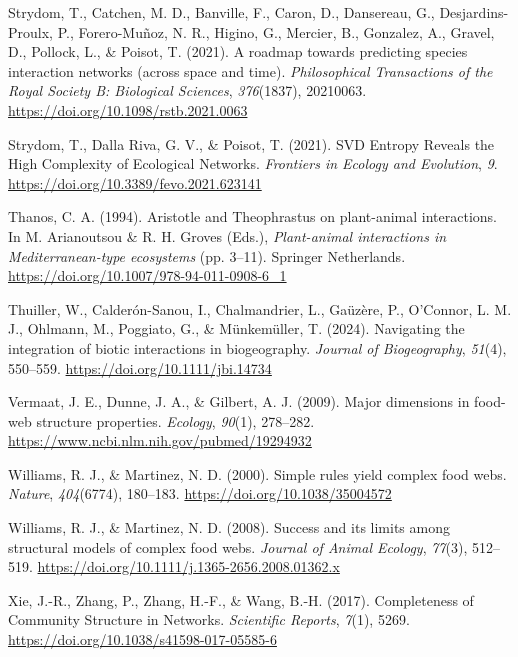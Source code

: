 \documentclass[
]{article}
\newlength{\cslhangindent}
\newenvironment{CSLReferences}[2] %
 {\begin{list}{}{%
  \setlength{\itemindent}{0pt}
  \setlength{\leftmargin}{0pt}
  \setlength{\parsep}{0pt}
  \ifodd #1
   \setlength{\leftmargin}{\cslhangindent}
   \setlength{\itemindent}{-1\cslhangindent}
  \fi
  \setlength{\itemsep}{#2\baselineskip}}}
 {\end{list}}
\begin{document}
\begin{CSLReferences}{1}{0}
Strydom, T., Catchen, M. D., Banville, F., Caron, D., Dansereau, G.,
Desjardins-Proulx, P., Forero-Muñoz, N. R., Higino, G., Mercier, B.,
Gonzalez, A., Gravel, D., Pollock, L., \& Poisot, T. (2021). A roadmap
towards predicting species interaction networks (across space and time).
\emph{Philosophical Transactions of the Royal Society B: Biological
Sciences}, \emph{376}(1837), 20210063.
\url{https://doi.org/10.1098/rstb.2021.0063}

Strydom, T., Dalla Riva, G. V., \& Poisot, T. (2021). {SVD Entropy
Reveals} the {High Complexity} of {Ecological Networks}. \emph{Frontiers
in Ecology and Evolution}, \emph{9}.
\url{https://doi.org/10.3389/fevo.2021.623141}

Thanos, C. A. (1994). Aristotle and {Theophrastus} on plant-animal
interactions. In M. Arianoutsou \& R. H. Groves (Eds.),
\emph{Plant-animal interactions in {Mediterranean-type} ecosystems} (pp.
3--11). Springer Netherlands.
\url{https://doi.org/10.1007/978-94-011-0908-6_1}

Thuiller, W., Calderón-Sanou, I., Chalmandrier, L., Gaüzère, P.,
O'Connor, L. M. J., Ohlmann, M., Poggiato, G., \& Münkemüller, T.
(2024). Navigating the integration of biotic interactions in
biogeography. \emph{Journal of Biogeography}, \emph{51}(4), 550--559.
\url{https://doi.org/10.1111/jbi.14734}

Vermaat, J. E., Dunne, J. A., \& Gilbert, A. J. (2009). Major dimensions
in food-web structure properties. \emph{Ecology}, \emph{90}(1),
278--282. \url{https://www.ncbi.nlm.nih.gov/pubmed/19294932}

Williams, R. J., \& Martinez, N. D. (2000). Simple rules yield complex
food webs. \emph{Nature}, \emph{404}(6774), 180--183.
\url{https://doi.org/10.1038/35004572}

Williams, R. J., \& Martinez, N. D. (2008). Success and its limits among
structural models of complex food webs. \emph{Journal of Animal
Ecology}, \emph{77}(3), 512--519.
\url{https://doi.org/10.1111/j.1365-2656.2008.01362.x}

Xie, J.-R., Zhang, P., Zhang, H.-F., \& Wang, B.-H. (2017). Completeness
of {Community Structure} in {Networks}. \emph{Scientific Reports},
\emph{7}(1), 5269. \url{https://doi.org/10.1038/s41598-017-05585-6}

\end{CSLReferences}
\end{document}
